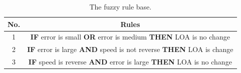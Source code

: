 \documentclass[a4paper,12pt,oneside,openright]{bhamthesis}
\begin{document}
\begin{table}
    \begin{tabular}{|c|c|}
    \hline
    No. & Rules                                                                \\ \hline
    1   & \textbf{IF} error is small \textbf{OR} error is medium \textbf{THEN} LOA is no change \\ \hline
    2   & \textbf{IF} error is large \textbf{AND} speed is not reverse \textbf{THEN} LOA is change \\ \hline
    3   & \textbf{IF} speed is reverse \textbf{AND} error is large \textbf{THEN} LOA is no change  \\ \hline
    \end{tabular}
    \caption {The fuzzy rule base.}
    \label{table:rule_base}
\end{table}
\end{document}
